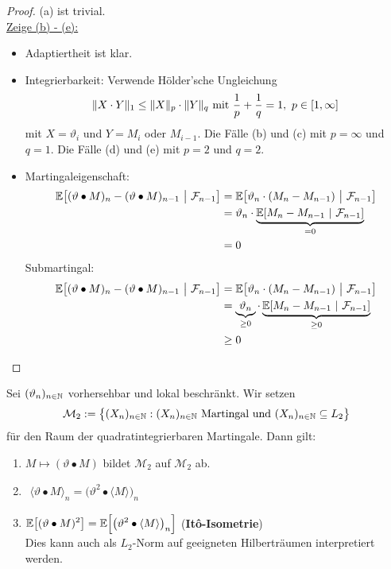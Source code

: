 \begin{proof}
(a) ist trivial.\\

\underline{Zeige (b) - (e):}
\begin{itemize}
\item Adaptiertheit ist klar.
\item Integrierbarkeit: Verwende Hölder'sche Ungleichung
\begin{align*}
\Vert X\cdot Y\Vert_1\leq\Vert X\Vert_p\cdot\Vert Y\Vert_q\mit\frac{1}{p}+\frac{1}{q}=1,~p\in[1,\infty]
\end{align*}
mit $X=\vartheta_i$ und $Y=M_i$ oder $M_{i-1}$. Die Fälle (b) und (c) mit $p=\infty$ und $q=1$. Die Fälle (d) und (e) mit $p=2$ und $q=2$.
\item Martingaleigenschaft:
\begin{align*}
\E\big[(\vartheta\bullet M)_n-(\vartheta\bullet M)_{n-1}~\big|~\F_{n-1}\big]
&=\E\big[\vartheta_n\cdot(M_n-M_{n-1})~\big|~\F_{n-1}\big]\\
&=\vartheta_n\cdot\underbrace{\E[M_n-M_{n-1}~|~\F_{n-1}]}_{=0}\\
&=0
\end{align*}
Submartingal:
\begin{align*}
\E\big[(\vartheta\bullet M)_n-(\vartheta\bullet M)_{n-1}~\big|~\F_{n-1}\big]
&=\E\big[\vartheta_n\cdot(M_n-M_{n-1})~\big|~\F_{n-1}\big]\\
&=\underbrace{\vartheta_n}_{\geq0}\cdot\underbrace{\E[M_n-M_{n-1}~|~\F_{n-1}]}_{\geq0}\\
&\geq0
\end{align*}
\end{itemize}
\end{proof}

\begin{proposition}\label{prop2.6}
Sei $(\vartheta_n)_{n\in\N}$ vorhersehbar und lokal beschränkt. Wir setzen
\begin{align*}
	\mathcal{M}_2:=\big\lbrace (X_n)_{n\in\N}:(X_n)_{n\in\N}\text{ Martingal und }(X_n)_{n\in\N}\subseteq L_2\big\rbrace
\end{align*}
für den Raum der quadratintegrierbaren Martingale. Dann gilt:
\begin{enumerate}[label=(\alph*)]
	\item $M\mapsto(\vartheta\bullet M)$ bildet $\mathcal{M}_2$ auf $\mathcal{M}_2$ ab.
\item $\begin{aligned}
\langle\vartheta\bullet M\rangle_n=\big(\vartheta^2\bullet\langle M\rangle\big)_n
\end{aligned}$
\item $\begin{aligned}
\E\big[(\vartheta\bullet M)^2\big]=\E\Big[\big(\vartheta^2\bullet\langle M\rangle\big)_n\Big]
\end{aligned}$ (\textbf{It\^o-Isometrie})\\
Dies kann auch als $L_2$-Norm auf geeigneten Hilberträumen interpretiert werden.
\end{enumerate}
\end{proposition}


